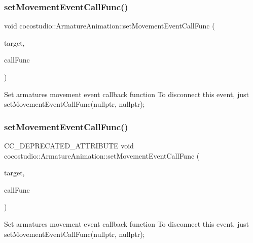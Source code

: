 \subsubsection{\texorpdfstring{set\+Movement\+Event\+Call\+Func()}{setMovementEventCallFunc()}\hspace{0.1cm}{\footnotesize\ttfamily [1/2]}}
{\footnotesize\ttfamily void cocostudio\+::\+Armature\+Animation\+::set\+Movement\+Event\+Call\+Func (\begin{DoxyParamCaption}\item[{cocos2d\+::\+Ref $\ast$}]{target,  }\item[{S\+E\+L\+\_\+\+Movement\+Event\+Call\+Func}]{call\+Func }\end{DoxyParamCaption})}

Set armature\textquotesingle{}s movement event callback function To disconnect this event, just set\+Movement\+Event\+Call\+Func(nullptr, nullptr); \mbox{\label{classcocostudio_1_1ArmatureAnimation_a5b4f25c5dfd203bcea77d00922270281}} 
\subsubsection{\texorpdfstring{set\+Movement\+Event\+Call\+Func()}{setMovementEventCallFunc()}\hspace{0.1cm}{\footnotesize\ttfamily [2/2]}}
{\footnotesize\ttfamily C\+C\+\_\+\+D\+E\+P\+R\+E\+C\+A\+T\+E\+D\+\_\+\+A\+T\+T\+R\+I\+B\+U\+TE void cocostudio\+::\+Armature\+Animation\+::set\+Movement\+Event\+Call\+Func (\begin{DoxyParamCaption}\item[{cocos2d\+::\+Ref $\ast$}]{target,  }\item[{S\+E\+L\+\_\+\+Movement\+Event\+Call\+Func}]{call\+Func }\end{DoxyParamCaption})}

Set armature\textquotesingle{}s movement event callback function To disconnect this event, just set\+Movement\+Event\+Call\+Func(nullptr, nullptr); \mbox{\label{classcocostudio_1_1ArmatureAnimation_ae642ac47eda15afa351247aa304b852f}} 
